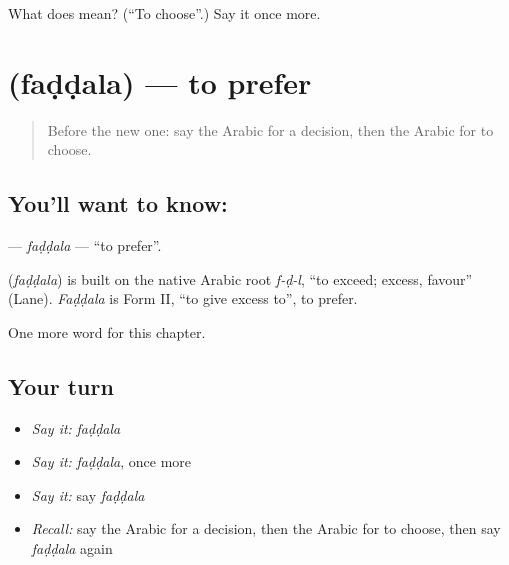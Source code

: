 \begin{tcolorbox}[breakable,colback=teal!4,colframe=teal!35!black,title={Before you move on}]
What does  mean? (\textquotedblleft{}To choose\textquotedblright{}.) Say it once more.
\end{tcolorbox}
\section[\texorpdfstring{\ar{فضل} (faḍḍala)}{فضل (faḍḍala)}]{ (faḍḍala) — to prefer}

\label{lesson:AR-C115-faddala}



\begin{quote}
Before the new one: say the Arabic for a decision, then the Arabic for to choose.
\end{quote}

\subsection*{You'll want to know: }
\textbf{} — \emph{faḍḍala} — \textquotedblleft{}to prefer\textquotedblright{}.

\begin{cousinweb}
\textbf{} (\emph{faḍḍala}) is built on the native Arabic root \emph{f-ḍ-l}, \textquotedblleft{}to exceed; excess, favour\textquotedblright{} (Lane). \emph{Faḍḍala} is Form II, \textquotedblleft{}to give excess to\textquotedblright{}, to prefer.
\end{cousinweb}

\begin{grammarlens}[title={What you've built}]
One more word for this chapter.
\end{grammarlens}

\subsection*{Your turn}
\begin{itemize}
\raggedright
  \item \emph{Say it:} \emph{faḍḍala}
  \item \emph{Say it:} \emph{faḍḍala}, once more
  \item \emph{Say it:} say \emph{faḍḍala}
  \item \emph{Recall:} say the Arabic for a decision, then the Arabic for to choose, then say \emph{faḍḍala} again
\end{itemize}

